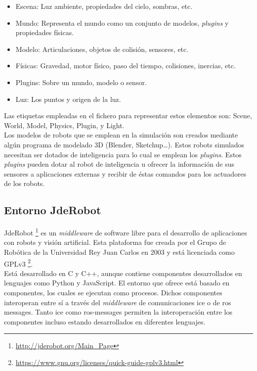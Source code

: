 \begin{itemize}
\item Escena: Luz ambiente, propiedades del cielo, sombras, etc.
\item Mundo: Representa el mundo como un conjunto de modelos, \textit{plugins} y propiedades físicas.
\item Modelo: Articulaciones, objetos de colisión, sensores, etc.
\item Físicas: Gravedad, motor físico, paso del tiempo, colisiones, inercias, etc.
\item Plugins: Sobre un mundo, modelo o sensor.
\item Luz: Los puntos y origen de la luz.
\end{itemize}

Las etiquetas empleadas en el fichero para representar estos elementos son: Scene, World, Model, Physics, Plugin, y Light.\\

Los modelos de robots que se emplean en la simulación son creados mediante algún programa de modelado 3D (Blender, Sketchup…). Estos robots simulados necesitan ser dotados de inteligencia para lo cual se emplean los \textit{plugins}. Estos \textit{plugins} pueden dotar al robot de inteligencia u ofrecer la información de sus sensores a aplicaciones externas y recibir de éstas comandos para los actuadores de los robots.


\subsection{Entorno JdeRobot}

JdeRobot \footnote{\url{http://jderobot.org/Main_Page}} es un \textit{middleware} de software libre para el desarrollo de aplicaciones con robots y visión artificial. Esta plataforma fue creada por el Grupo de Robótica de la Universidad Rey Juan Carlos en 2003 y está licenciada como GPLv3 \footnote{\url{https://www.gnu.org/licenses/quick-guide-gplv3.html}}.\\

Está desarrollado en C y C++, aunque contiene componentes desarrollados en lenguajes como Python y JavaScript. El entorno que ofrece está basado en componentes, los cuales se ejecutan como procesos. Dichos componentes interoperan entre sí a través del \textit{middleware} de comunicaciones \acrshort{ice} o de \acrshort{ros} messages. Tanto \acrshort{ice} como \acrshort{ros}-messages permiten la interoperación entre los componentes incluso estando desarrollados en diferentes lenguajes.\\

